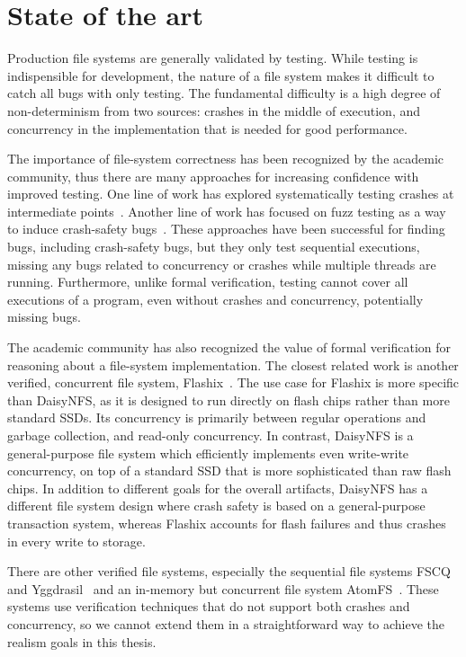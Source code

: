 \section{State of the art}

Production file systems are generally validated by testing. While testing is
indispensible for development, the nature of a file system makes it difficult to
catch all bugs with only testing. The fundamental difficulty is a high degree of
non-determinism from two sources: crashes in the middle of execution, and
concurrency in the implementation that is needed for good performance.

The importance of file-system correctness has been recognized by the academic
community, thus there are many approaches for increasing confidence with
improved testing. One line of work has explored systematically testing crashes
at intermediate points~\cite{mohan:crashmonkey,pillai:appcrash}. Another line of
work has focused on fuzz testing as a way to induce crash-safety
bugs~\cite{xu:janus,kim:hydra}. These approaches have been successful for
finding bugs, including crash-safety bugs, but they only test sequential
executions, missing any bugs related to concurrency or crashes while multiple
threads are running. Furthermore, unlike formal verification, testing cannot
cover all executions of a program, even without crashes and concurrency,
potentially missing bugs.

The academic community has also recognized the value of formal verification for
reasoning about a file-system implementation. The closest related work is
another verified, concurrent file system, Flashix~\cite{bodenmuller:concurrent-flashix}. The use case for Flashix is
more specific than DaisyNFS, as it is designed to run directly on flash chips
rather than more standard SSDs.
Its concurrency is primarily between regular operations and garbage collection,
and read-only concurrency. In contrast, DaisyNFS is a general-purpose file
system which efficiently implements even write-write concurrency, on top of a
standard SSD that is more sophisticated than raw flash chips. In addition to different
goals for the overall artifacts, DaisyNFS has a different file system design
where crash safety is based on a general-purpose transaction system, whereas
Flashix accounts for flash failures and thus crashes in every write to storage.

There are other verified file systems, especially the sequential file systems
FSCQ~\cite{chen:fscq} and Yggdrasil~\cite{sigurbjarnarson:yggdrasil} and an
in-memory but concurrent file system AtomFS~\cite{zou:atomfs}. These systems use
verification techniques that do not support both crashes and concurrency, so we
cannot extend them in a straightforward way to achieve the realism goals in this
thesis.

